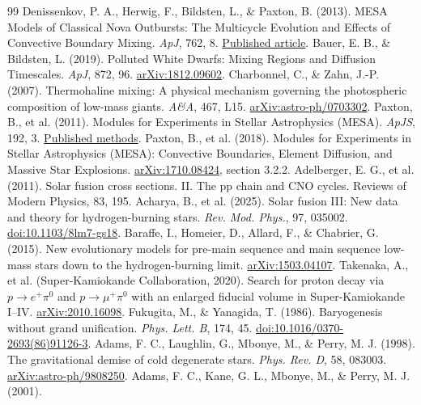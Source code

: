 \documentclass[11pt,letterpaper]{article}
\begin{document}
\begin{thebibliography}{99}
 Denissenkov, P. A., Herwig, F., Bildsten, L.,
\& Paxton, B. (2013). MESA Models of Classical Nova Outbursts: The Multicycle
Evolution and Effects of Convective Boundary Mixing. \emph{ApJ}, 762, 8.
\href{https://doi.org/10.1088/0004-637X/762/1/8}{Published article}.
 Bauer, E. B., \& Bildsten, L. (2019).
Polluted White Dwarfs: Mixing Regions and Diffusion Timescales.
\emph{ApJ}, 872, 96. \href{https://arxiv.org/abs/1812.09602}{arXiv:1812.09602}.
 Charbonnel, C., \& Zahn, J.-P. (2007).
Thermohaline mixing: A physical mechanism governing the photospheric
composition of low-mass giants. \emph{A\&A}, 467, L15.
\href{https://arxiv.org/abs/astro-ph/0703302}{arXiv:astro-ph/0703302}.
 Paxton, B., et al. (2011).
Modules for Experiments in Stellar Astrophysics (MESA).
\emph{ApJS}, 192, 3.
\href{https://doi.org/10.1088/0067-0049/192/1/3}{Published methods}.
 Paxton, B., et al. (2018).
Modules for Experiments in Stellar Astrophysics (MESA): Convective Boundaries,
Element Diffusion, and Massive Star Explosions.
\href{https://arxiv.org/abs/1710.08424}{arXiv:1710.08424}, section 3.2.2.
 Adelberger, E. G., et al. (2011).
Solar fusion cross sections. II. The pp chain and CNO cycles.
Reviews of Modern Physics, 83, 195.
 Acharya, B., et al. (2025).
Solar fusion III: New data and theory for hydrogen-burning stars.
\emph{Rev. Mod. Phys.}, 97, 035002.
\href{https://doi.org/10.1103/8lm7-gs18}{doi:10.1103/8lm7-gs18}.
 Baraffe, I., Homeier, D., Allard, F., \& Chabrier, G. (2015).
New evolutionary models for pre-main sequence and main sequence low-mass stars
down to the hydrogen-burning limit.
\href{https://arxiv.org/abs/1503.04107}{arXiv:1503.04107}.
 Takenaka, A., et al. (Super-Kamiokande Collaboration, 2020).
Search for proton decay via $p\to e^+\pi^0$ and $p\to\mu^+\pi^0$
with an enlarged fiducial volume in Super-Kamiokande I--IV.
\href{https://arxiv.org/abs/2010.16098}{arXiv:2010.16098}.
 Fukugita, M., \& Yanagida, T. (1986).
Baryogenesis without grand unification. \emph{Phys. Lett. B}, 174, 45.
\href{https://doi.org/10.1016/0370-2693(86)91126-3}{doi:10.1016/0370-2693(86)91126-3}.
 Adams, F. C., Laughlin, G., Mbonye, M., \& Perry, M. J. (1998).
The gravitational demise of cold degenerate stars. \emph{Phys. Rev. D}, 58, 083003.
\href{https://arxiv.org/abs/astro-ph/9808250}{arXiv:astro-ph/9808250}.
 Adams, F. C., Kane, G. L., Mbonye, M., \& Perry, M. J. (2001).

\end{thebibliography}
\end{document}
